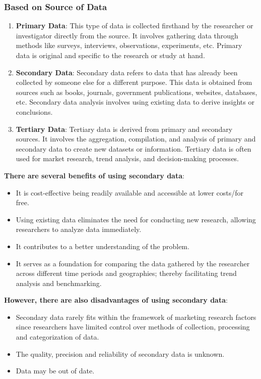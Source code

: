 \documentclass{article}
\begin{document}
\subsubsection{Based on Source of Data}
\begin{enumerate}
    \item \textbf{Primary Data}: This type of data is collected firsthand by the researcher or investigator directly from the source. It involves gathering data through methods like surveys, interviews, observations, experiments, etc. Primary data is original and specific to the research or study at hand.

    \item \textbf{Secondary Data}: Secondary data refers to data that has already been collected by someone else for a different purpose. This data is obtained from sources such as books, journals, government publications, websites, databases, etc. Secondary data analysis involves using existing data to derive insights or conclusions.

    \item \textbf{Tertiary Data}: Tertiary data is derived from primary and secondary sources. It involves the aggregation, compilation, and analysis of primary and secondary data to create new datasets or information. Tertiary data is often used for market research, trend analysis, and decision-making processes.
\end{enumerate}
\bigskip

\noindent \textbf{There are several benefits of using secondary data}:
\begin{itemize}
    \item It is cost-effective being readily available and accessible at lower costs/for free.
    \item Using existing data eliminates the need for conducting new research, allowing researchers to analyze data immediately.
    \item It contributes to a better understanding of the problem.
    \item It serves as a foundation for comparing the data gathered by the researcher across different time periods and geographies; thereby facilitating trend analysis and benchmarking.
\end{itemize}

\noindent \textbf{However, there are also disadvantages of using secondary data}:
\begin{itemize}
    \item Secondary data rarely fits within the framework of marketing research factors since researchers have limited control over methods of collection, processing and categorization of data.
    \item The quality, precision and reliability of secondary data is unknown.
    \item Data may be out of date.
\end{itemize}
\end{document}
